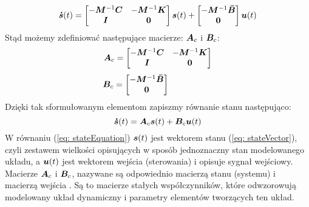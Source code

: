\begin{equation}
	\bm{\dot{s}}(t) = 
	\begin{bmatrix}
		-\bm{M}^{-1}\bm{C} & -\bm{M}^{-1}\bm{K} \\
		\bm{I} & \bm{0}
	\end{bmatrix} \bm{s}(t) + 
	\begin{bmatrix}
		-\bm{M}^{-1}\bm{\bar{B}} \\
		\bm{0}
	\end{bmatrix} \bm{u}(t)
\end{equation}
Stąd możemy zdefiniować następujące macierze: $\bm{A}_c$ i $\bm{B}_c$:
\begin{equation}
	\bm{A}_c = 
	\begin{bmatrix}
		-\bm{M}^{-1}\bm{C} & -\bm{M}^{-1}\bm{K} \\
		\bm{I} & \bm{0}
	\end{bmatrix} 
\end{equation}
\begin{equation}
	\bm{B}_c = 
	\begin{bmatrix}
		-\bm{M}^{-1}\bm{\bar{B}} \\
		\bm{0}
	\end{bmatrix}\phantom{\qquad\qquad\quad}
\end{equation}
Dzięki tak sformułowanym elementom zapiszmy równanie stanu  następująco:
\begin{equation} \label{eq: stateEquation}
	\bm{\dot{s}}(t)= \bm{A}_c\bm{s}(t)+\bm{B}_c\bm{u}(t)
\end{equation}
W równaniu (\ref{eq: stateEquation}) $\bm{s}(t)$ jest wektorem stanu (\ref{eq: stateVector}), czyli zestawem wielkości opisujących w sposób jednoznaczny stan modelowanego układu, a $\bm{u}(t)$ jest wektorem wejścia (sterowania) i opisuje sygnał wejściowy. Macierze $\bm{A}_c$ i $\bm{B}_c$, nazywane są odpowiednio macierzą stanu (systemu)  i macierzą wejścia . Są to macierze stałych współczynników, które odwzorowują modelowany układ dynamiczny i parametry elementów tworzących ten układ.

